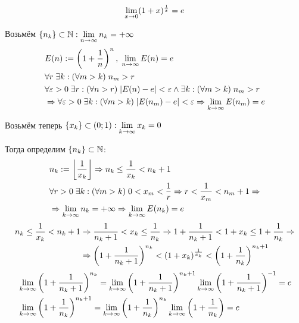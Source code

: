 \documentclass{article}
\begin{document}

\theorem
\begin{align*}
	\lim\limits_{x\to 0}(1+x)^{\frac{1}{x}}=e
\end{align*}

\proof

Возьмём $\{n_{k}\}\subset\mathbb{N}:\lim\limits_{n\to\infty} n_{k}=+\infty$
\begin{align*}
	 & E(n):=\left(1+\frac{1}{n}\right)^{n},\;\lim\limits_{n\to\infty} E(n)=e                                           \\
	 & \forall r\;\exists k:(\forall m>k)\;n_{m}>r                                                     \\
	 & \forall\varepsilon>0\;\exists r:(\forall n>r)\;|E(n)-e|<\varepsilon\land\exists k:(\forall m>k)\;n_{m}>r      \\
	 & \Rightarrow\forall\varepsilon>0\;\exists k:(\forall m>k)\;|E(n_{m})-e|<\varepsilon\Rightarrow \lim\limits_{k\to\infty}E(n_{m})=e
\end{align*}

Возьмём теперь $\{x_{k}\}\subset(0;1):\lim\limits_{k\to\infty}x_{k}=0$

Тогда определим $\{n_{k}\}\subset\mathbb{N}$:
\begin{align*}
	 & n_{k}:=\left\lfloor\frac{1}{x_{k}}\right\rfloor\Rightarrow n_{k}\leq \frac{1}{x_{k}}<n_{k}+1        \\
	 & \forall r>0\;\exists k:(\forall m>k)\;0<x_{m}<\frac{1}{r}\Rightarrow r<\frac{1}{x_{m}}<n_{m}+1\Rightarrow \\
	 & \Rightarrow\lim\limits_{k\to\infty}n_{k}=+\infty\Rightarrow \lim\limits_{k\to\infty}E(n_{k})=e
\end{align*}
\begin{align*}
	n_{k}\leq\frac{1}{x_{k}}<n_{k}+1
	 & \Rightarrow \frac{1}{n_{k}+1}<x_{k}\leq\frac{1}{n_{k}}\Rightarrow 1+\frac{1}{n_{k}+1}<1+x_{k}\leq 1+\frac{1}{n_{k}}\Rightarrow        \\
	 & \Rightarrow \left(1+\frac{1}{n_{k}+1}\right)^{n_{k}}<(1+x_{k})^{\frac{1}{x_{k}}}<\left(1+\frac{1}{n_{k}}\right)^{n_{k}+1}
\end{align*}
\begin{align*}
	 & \lim\limits_{k\to\infty}\left(1+\frac{1}{n_{k}+1}\right)^{n_{k}}=\lim\limits_{k\to\infty}\left(1+\frac{1}{n_{k}+1}\right)^{n_{k}+1}\lim\limits_{k\to\infty}\left(1+\frac{1}{n_{k}+1}\right)^{-1}=e \\
	 & \lim\limits_{k\to\infty}\left(1+\frac{1}{n_{k}}\right)^{n_{k}+1}=\lim\limits_{k\to\infty}\left(1+\frac{1}{n_{k}}\right)^{n_{k}}\lim\limits_{k\to\infty}\left(1+\frac{1}{n_{k}}\right)=e
\end{align*}
\end{document}
